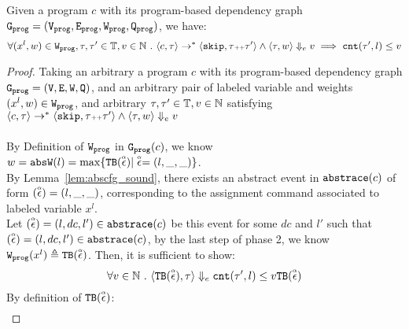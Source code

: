   {
  \begin{thm}
    \label{thm:rb_soundness}
  Given a program ${c}$ with its program-based dependency graph 
  $\progG = (\progV, \progE, \progW, \progF)$,
  we have:
  \[
  \forall (x^l, w) \in \progW, \vtrace, \trace' \in \mathbb{T},
  v \in \mathbb{N}
   \st 
  \config{{c}, \trace} \to^{*} \config{\eskip, \trace\tracecat\vtrace'} 
  \land 
  \config{\trace, w} \earrow v
  \implies
  \vcounter(\vtrace', l) \leq v
  \]
  \end{thm}
  }
\begin{proof}
  Taking an arbitrary a program ${c}$ with its program-based dependency graph $\progG = (\vertxs, \edges, \weights, \qflag)$, 
  and an arbitrary pair of labeled variable and weights $(x^l, w) \in \progW$, 
  and arbitrary $\vtrace, \trace' \in \mathbb{T},
  v \in \mathbb{N}$ satisfying
  \\
  $\config{{c}, \trace} \to^{*} \config{\eskip, \trace\tracecat\vtrace'} 
  \land 
  \config{\trace, w} \earrow v$
  \\
  \\
  By Definition of $\progW$ in $\progG(c)$, we know 
  $  w = \absW(l) = \max \{ \absclr(\absevent) | \absevent = (l, \_, \_)\}$.
  \\
  By Lemma~\ref{lem:abscfg_sound}, there exists an abstract event in $\absflow(c)$ of form $(\absevent) = (l, \_, \_)$,
  corresponding to the assignment command associated to labeled variable $x^l$. 
  \\
  Let $(\absevent) = (l, dc, l') \in \absflow(c)$ be this event for some $dc$ and $l'$ such that  $(\absevent) = (l, dc, l') \in \absflow(c)$,
  by the last step of phase 2, we know
  $
  \progW(x^l) 
  \triangleq \absclr(\absevent)
  $.
   Then, it is sufficient to show:
  \[
  \forall v \in \mathbb{N} \st 
  \config{\absclr(\absevent), \trace} \earrow 
  \vcounter(\vtrace', l) \leq v
  \absclr(\absevent)
  \]
  By definition of $\absclr(\absevent)$:
  \[
 \begin{array}{ll}

\end{array}\]
\end{proof}
